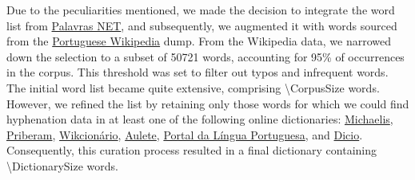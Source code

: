 \documentclass{article}
\begin{document}



Due to the peculiarities mentioned, we made the decision to integrate the word
list from \href{https://www.palavras.net/}{Palavras NET}, and subsequently, we
augmented it with words sourced from the
\href{https://pt.wikipedia.org}{Portuguese Wikipedia} dump. From the Wikipedia
data, we narrowed down the selection to a subset of \num{50721} words,
accounting for 95\% of occurrences in the corpus. This threshold was set to
filter out typos and infrequent words. The initial word list became quite
extensive, comprising \num{\CorpusSize} words. However, we refined the list by
retaining only those words for which we could find hyphenation data in at least
one of the following online dictionaries:
\href{https://michaelis.uol.com.br/}{Michaelis},
\href{https://dicionario.priberam.org/}{Priberam},
\href{https://pt.wiktionary.org}{Wikcionário},
\href{https://aulete.com.br/}{Aulete},
\href{http://www.portaldalinguaportuguesa.org/}{Portal da Língua Portuguesa}, and
\href{https://www.dicio.com.br/}{Dicio}.
Consequently, this curation process resulted in a final dictionary containing
\num{\DictionarySize} words.  
\end{document}
